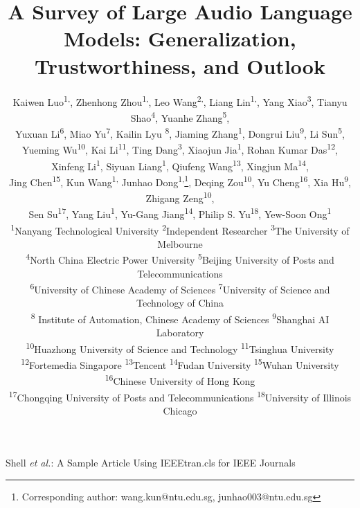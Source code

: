 \documentclass[10pt,journal,compsoc,lettersize]{IEEEtran}
\begin{document}




\title{ A Survey of Large Audio Language Models: Generalization, Trustworthiness, and Outlook}

%
{Shell \MakeLowercase{\textit{et al.}}: A Sample Article Using IEEEtran.cls for IEEE Journals}


\author{
Kaiwen Luo\textsuperscript{1,},
Zhenhong Zhou\textsuperscript{1,},
Leo Wang\textsuperscript{2,},
Liang Lin\textsuperscript{1,},
Yang Xiao\textsuperscript{3},
Tianyu Shao\textsuperscript{4},
Yuanhe Zhang\textsuperscript{5},\\
Yuxuan Li\textsuperscript{6},
Miao Yu\textsuperscript{7},
Kailin Lyu \textsuperscript{8},
Jiaming Zhang\textsuperscript{1},
Dongrui Liu\textsuperscript{9},
Li Sun\textsuperscript{5},
Yueming Wu\textsuperscript{10},
Kai Li\textsuperscript{11},
Ting Dang\textsuperscript{3},
Xiaojun Jia\textsuperscript{1},
Rohan Kumar Das\textsuperscript{12},
Xinfeng Li\textsuperscript{1},
Siyuan Liang\textsuperscript{1},
Qiufeng Wang\textsuperscript{13},
Xingjun Ma\textsuperscript{14},\\
Jing Chen\textsuperscript{15},
Kun Wang\textsuperscript{1,}
Junhao Dong\textsuperscript{1,}\thanks{Corresponding author: wang.kun@ntu.edu.sg, junhao003@ntu.edu.sg},
Deqing Zou\textsuperscript{10},
Yu Cheng\textsuperscript{16},
Xia Hu\textsuperscript{9},
Zhigang Zeng\textsuperscript{10},\\
Sen Su\textsuperscript{17},
Yang Liu\textsuperscript{1},
Yu-Gang Jiang\textsuperscript{14},
Philip S. Yu\textsuperscript{18},
Yew-Soon Ong\textsuperscript{1}
\\[1\baselineskip]
\textsuperscript{1}Nanyang Technological University
\textsuperscript{2}Independent Researcher
\textsuperscript{3}The University of Melbourne\\
\textsuperscript{4}North China Electric Power University
\textsuperscript{5}Beijing University of Posts and Telecommunications\\
\textsuperscript{6}University of Chinese Academy of Sciences
\textsuperscript{7}University of Science and Technology of China\\
\textsuperscript{8} Institute of Automation, Chinese Academy of Sciences
\textsuperscript{9}Shanghai AI Laboratory\\
\textsuperscript{10}Huazhong University of Science and Technology
\textsuperscript{11}Tsinghua University
\textsuperscript{12}Fortemedia Singapore
\textsuperscript{13}Tencent
\textsuperscript{14}Fudan University
\textsuperscript{15}Wuhan University
\textsuperscript{16}Chinese University of Hong Kong\\
\textsuperscript{17}Chongqing University of Posts and Telecommunications
\textsuperscript{18}University of Illinois Chicago

}
\end{document}
